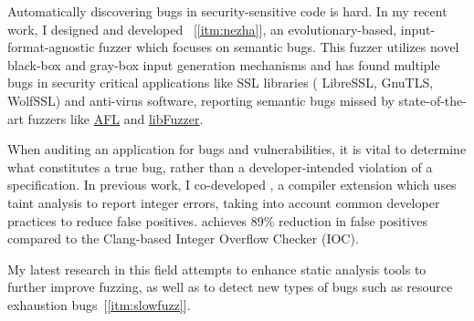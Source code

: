 


\begin{cvparagraph}

Automatically discovering bugs in security-sensitive code is hard.  In my
recent work, I designed and developed \nezha~[\ref{itm:nezha}],
an evolutionary-based,
input-format-agnostic fuzzer which focuses on semantic bugs. This fuzzer
utilizes novel black-box and gray-box input generation mechanisms and has found
multiple bugs in security critical applications like SSL libraries (\eg
LibreSSL, GnuTLS, WolfSSL) and anti-virus software, reporting semantic bugs
missed by state-of-the-art fuzzers like
\href{http://lcamtuf.coredump.cx/afl/}{AFL} and
\href{http://llvm.org/docs/LibFuzzer.html}{libFuzzer}.

When auditing an application for bugs and vulnerabilities, it is vital to
determine what constitutes a true bug, rather than a developer-intended
violation of a specification. In previous work, I co-developed
\intflow [\ref{itm:intflow}], a compiler extension which uses taint
analysis to report integer errors, taking into account common developer practices
to reduce false positives. \intflow achieves 89\% reduction in
false positives compared to the Clang-based Integer Overflow Checker (IOC).

My latest research in this field attempts to enhance static analysis tools to
further improve fuzzing, as well as to detect new types of bugs such as
resource exhaustion bugs~[\ref{itm:slowfuzz}].
\end{cvparagraph}


